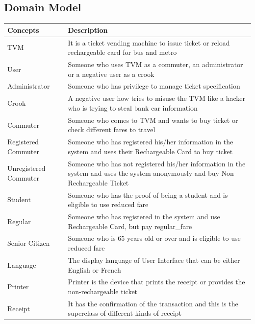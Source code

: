 \documentclass[a4paper,12pt]{report}
\begin{document}
\subsection{Domain Model}
\setlength{\tabcolsep}{18pt}
\renewcommand{\arraystretch}{1.5}
\begin{tabular}[H]{ |p{3cm}|p{12cm}| }
	\hline
	\textbf{Concepts}  & \textbf{Description}  \\
	\hline
	TVM & It is a ticket vending machine to issue ticket or reload rechargeable card for bus and metro
	\\
	\hline
	User & Someone who uses TVM as a commuter, an administrator or a negative user as a crook
	\\
	\hline
	Administrator & Someone who has privilege to manage ticket specification
	\\
	\hline
	Crook & A negative user how tries to misuse the TVM like a hacker who is trying to steal bank car information
	\\
	\hline
	Commuter & Someone who comes to TVM and wants to buy ticket or check different fares to travel
	\\
	\hline
	Registered Commuter & Someone who has registered his/her information in the system and uses their Rechargeable Card to buy ticket
	\\
	\hline
	Unregistered Commuter & Someone who has not registered his/her information in the system and uses the system anonymously and buy Non-Rechargeable Ticket
	\\
	\hline
	Student & Someone who has the proof of being a student and is eligible to use reduced fare
	\\
	\hline
	Regular & Someone who has registered in the system and use Rechargeable Card, but pay \gls{regular_fare}
	
	\\
	\hline
	Senior Citizen & Someone who is 65 years old or over and is eligible to use reduced fare
	\\
	\hline
	Language & The display language of User Interface that can be either English or French
	\\
	\hline
	Printer & Printer is the device that prints the receipt or provides the non-rechargeable ticket
	\\
	\hline 
	Receipt & It has the confirmation of the transaction and this is the superclass of different kinds of receipt
	\\
	\hline
\end{tabular}
	
\end{document}
